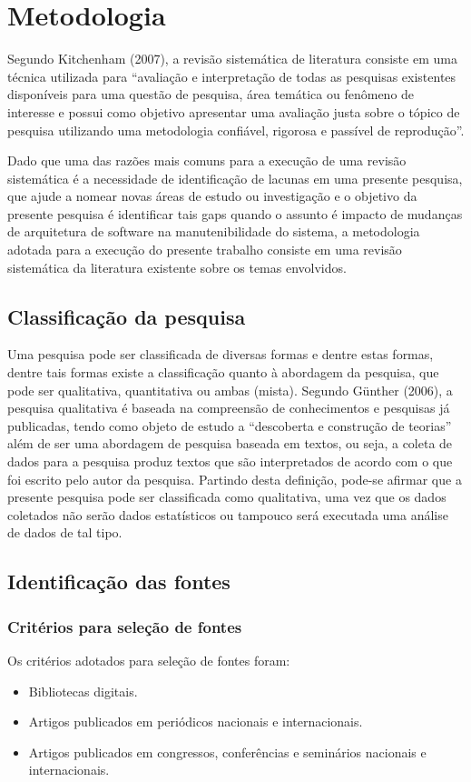 \chapter[Metodologia]{Metodologia}
Segundo Kitchenham (2007), a revisão sistemática de literatura consiste em uma técnica utilizada para “avaliação e interpretação de todas as pesquisas existentes disponíveis para uma questão de pesquisa, área temática ou fenômeno de interesse e possui como objetivo apresentar uma avaliação justa sobre o tópico de pesquisa utilizando uma metodologia confiável, rigorosa e passível de reprodução”.

Dado que uma das razões mais comuns para a execução de uma revisão sistemática é a necessidade de identificação de lacunas em uma presente pesquisa, que ajude a nomear novas áreas de estudo ou investigação e o objetivo da presente pesquisa é identificar tais gaps quando o assunto é impacto de mudanças de arquitetura de software na manutenibilidade do sistema, a metodologia adotada para a execução do presente trabalho consiste em uma revisão sistemática da literatura existente sobre os temas envolvidos.

\section{Classificação da pesquisa}
Uma pesquisa pode ser classificada de diversas formas e dentre estas formas, dentre tais formas existe a classificação quanto à abordagem da pesquisa, que pode ser qualitativa, quantitativa ou ambas (mista). Segundo Günther (2006), a pesquisa qualitativa é baseada na compreensão de conhecimentos e pesquisas já publicadas, tendo como objeto de estudo a “descoberta e construção de teorias” além de ser uma abordagem de pesquisa baseada em textos, ou seja, a coleta de dados para a pesquisa produz textos que são interpretados de acordo com o que foi escrito pelo autor da pesquisa. Partindo desta definição, pode-se afirmar que a presente pesquisa pode ser classificada como qualitativa, uma vez que os dados coletados não serão dados estatísticos ou tampouco será executada uma análise de dados de tal tipo.
\section{Identificação das fontes}
\subsection{Critérios para seleção de fontes}
Os critérios adotados para seleção de fontes foram:
\begin{itemize}
	\item Bibliotecas digitais.
	\item Artigos publicados em periódicos nacionais e internacionais.
	\item Artigos publicados em congressos, conferências e seminários nacionais e internacionais.
\end{itemize}

